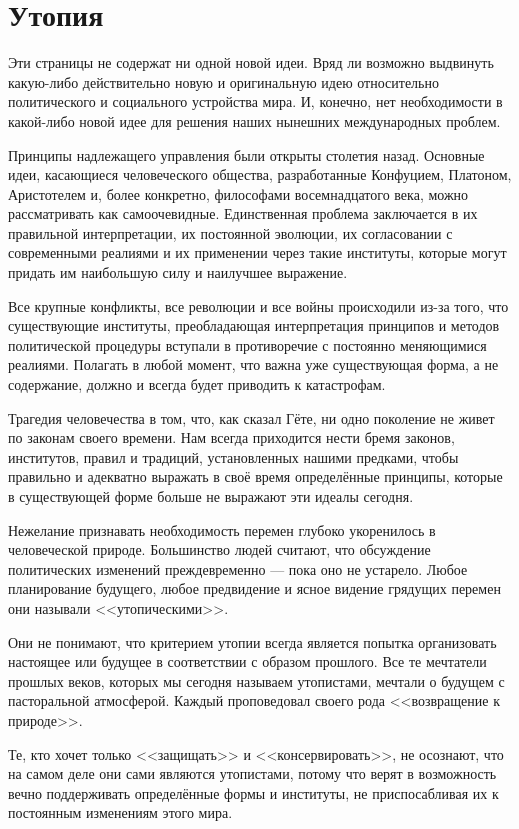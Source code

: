 \chapter{Утопия}

Эти страницы не содержат ни одной новой идеи. Вряд ли возможно выдвинуть какую-либо действительно новую и оригинальную идею относительно политического и социального устройства мира. И, конечно, нет необходимости в какой-либо новой идее для решения наших нынешних международных проблем.
 
Принципы надлежащего управления были открыты столетия назад. Основные идеи, касающиеся человеческого общества, разработанные Конфуцием, Платоном, Аристотелем и, более конкретно, философами восемнадцатого века, можно рассматривать как самоочевидные. Единственная проблема заключается в их правильной интерпретации, их постоянной эволюции, их согласовании с современными реалиями и их применении через такие институты, которые могут придать им наибольшую силу и наилучшее выражение.

Все крупные конфликты, все революции и все войны происходили из-за того, что существующие институты, преобладающая интерпретация принципов и методов политической процедуры вступали в противоречие с постоянно меняющимися реалиями. Полагать в любой момент, что важна уже существующая форма, а не содержание, должно и всегда будет приводить к катастрофам.

Трагедия человечества в том, что, как сказал Гёте, ни одно поколение не живет по законам своего времени. Нам всегда приходится нести бремя законов, институтов, правил и традиций, установленных нашими предками, чтобы правильно и адекватно выражать в своё время определённые принципы, которые в существующей форме больше не выражают эти идеалы сегодня.

Нежелание признавать необходимость перемен глубоко укоренилось в человеческой природе. Большинство людей считают, что обсуждение политических изменений преждевременно — пока оно не устарело. Любое планирование будущего, любое предвидение и ясное видение грядущих перемен они называли <<утопическими>>.

Они не понимают, что критерием утопии всегда является попытка организовать настоящее или будущее в соответствии с образом прошлого. Все те мечтатели прошлых веков, которых мы сегодня называем утопистами, мечтали о будущем с пасторальной атмосферой. Каждый проповедовал своего рода <<возвращение к природе>>.

Те, кто хочет только <<защищать>> и <<консервировать>>, не осознают, что на самом деле они сами являются утопистами, потому что верят в возможность вечно поддерживать определённые формы и институты, не приспосабливая их к постоянным изменениям этого мира.

